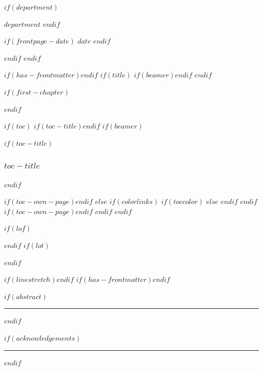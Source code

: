 \documentclass[
  $if(fontsize)$
    $fontsize$,
  $endif$
  $if(papersize)$$papersize$$else$a4paper$endif$,
  $for(classoption)$$classoption$$sep$,$endfor$,
  captions=tableheading
]{$if(beamer)$$documentclass$$else$$if(book)$scrbook$else$scrartcl$endif$$endif$}
\begin{document}
\begin{titlepage}
\begin{flushleft}
          $if(department)$
            \vspace{3pt}

            {\small\sffamily\itshape
              $department$
            }
          $endif$

        \vspace{0.8em}

        $if(frontpage-date)$
          \noindent
          {\small\sffamily\textcolor{titlepage-color}{$date$}}
        $endif$

      \end{flushleft}
    \end{titlepage}
    \restoregeometry
  $endif$
$endif$

$if(has-frontmatter)$\frontmatter$endif$
$if(title)$
  $if(beamer)$\frame{\titlepage}$endif$
$endif$

$if(first-chapter)$
  \setcounter{chapter}{$first-chapter$}\addtocounter{chapter}{-1}
$endif$

$if(toc)$
  $if(toc-title)$\renewcommand*\contentsname{$toc-title$}$endif$
  $if(beamer)$
    \begin{frame}[allowframebreaks]
      $if(toc-title)$\frametitle{$toc-title$}$endif$
      \tableofcontents[hideallsubsections]
    \end{frame}
    $if(toc-own-page)$\newpage$endif$
  $else$
    {
      $if(colorlinks)$
        $if(toccolor)$
          \hypersetup{linkcolor=$toccolor$}
        $else$
          \hypersetup{linkcolor=default-linkcolor}
        $endif$
      $endif$
      \setcounter{tocdepth}{$toc-depth$}
      \tableofcontents
      $if(toc-own-page)$\newpage$endif$
    }
  $endif$
$endif$

$if(lof)$\listoffigures$endif$
$if(lot)$\listoftables$endif$

$if(linestretch)$$endif$
$if(has-frontmatter)$\mainmatter$endif$

$if(abstract)$
  \begin{abstract}
    \justify {}
  \end{abstract}
  \par\noindent\rule{\textwidth}{0.4pt}
  \newpage
$endif$

$if(acknowledgements)$
  \begin{acknowledgements}
    \justify {}
  \end{acknowledgements}
  \par\noindent\rule{\textwidth}{0.4pt}
  \newpage
$endif$
\end{document}
